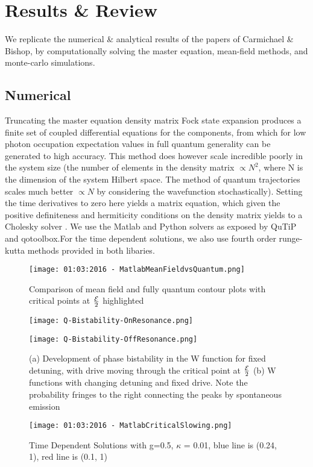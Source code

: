 
\section{Results \& Review}

We replicate the numerical \& analytical results of the papers of Carmichael  \& Bishop\cite{Carmichael2015}\cite{Bishop2010}, by computationally solving the master equation, mean-field methods, and monte-carlo simulations.

\subsection{Numerical}
Truncating the master equation density matrix Fock state expansion produces a finite set of coupled differential equations for the components, from which for low photon occupation expectation values in full quantum generality can be generated to high accuracy. This method does however scale incredible poorly in the system size (the number of elements in the density matrix $\propto N^2$, where N is the dimension of the system Hilbert space. The method of quantum trajectories scales much better \cite{Molmer1993} $\propto N$ by considering the wavefunction stochastically). Setting the time derivatives to zero here yields a matrix equation, which given the positive definiteness and hermiticity conditions on the density matrix yields to a Cholesky solver \cite{Press1992}. We use the Matlab and Python solvers as exposed by QuTiP \cite{Johansson2013a} and qotoolbox\cite{Tan}.For the time dependent solutions, we also use fourth order runge-kutta methods provided in both libaries.

\begin{figure}[ht]
 \texttt{[image: 01:03:2016 - MatlabMeanFieldvsQuantum.png]}
 \caption{Comparison of mean field and fully quantum contour plots with critical points at $\frac{\mathcal{E}}{2}$ highlighted}\label{fig:MeanFieldvsQuantum}
\end{figure}
\begin{figure}
 \begin{minipage}{.5\linewidth}
     \texttt{[image: Q-Bistability-OnResonance.png]}
  \end{minipage}%
  \begin{minipage}{.5\linewidth}
      \texttt{[image: Q-Bistability-OffResonance.png]}
  \end{minipage}
  \caption{(a) Development of phase bistability in the W function for fixed detuning, with drive moving through the critical point at $\frac{\mathcal{E}}{2}$ \label{fig:Qbistabilities}(b) W functions with changing detuning and fixed drive. Note the probability fringes to the right connecting the peaks by spontaneous emission}
\end{figure}
\begin{figure}
 \texttt{[image: 01:03:2016 - MatlabCriticalSlowing.png]}
  \caption{Time Dependent Solutions with g=0.5, $\kappa$ = 0.01, blue line is (0.24, 1), red line is (0.1, 1)}\label{fig:CriticalSlowing}
\end{figure}
